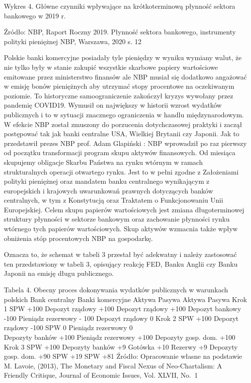 \documentclass[
]{book}
\begin{document}
Wykres 4. Główne czynniki wpływające na krótkoterminową płynność sektora bankowego w 2019 r.

Źródło: NBP, Raport Roczny 2019. Płynność sektora bankowego, instrumenty polityki pieniężnej NBP, Warszawa, 2020 s. 12

Polskie banki komercyjne posiadały tyle pieniędzy w wyniku wymiany walut, że nie tylko były w stanie zakupić wszystkie skarbowe papiery wartościowe emitowane przez ministerstwo finansów ale NBP musiał się dodatkowo angażować w emisję bonów pieniężnych aby utrzymać stopy procentowe na oczekiwanym poziomie. To historyczne samoograniczenie zakończył kryzys wywołany przez pandemię COVID19. Wymusił on największy w historii wzrost wydatków publicznych i to w sytuacji znacznego ograniczenia w handlu międzynarodowym. W efekcie NBP został zmuszony do porzucenia dotychczasowej praktyki i zaczął postępować tak jak banki centralne USA, Wielkiej Brytanii czy Japonii. Jak to przedstawił prezes NBP prof. Adam Glapiński : NBP wprowadził po raz pierwszy od początku transformacji program skupu aktywów finansowych. Od miesiąca skupujemy obligacje Skarbu Państwa na rynku wtórnym w ramach strukturalnych operacji otwartego rynku. Jest to w pełni zgodne z Założeniami polityki pieniężnej oraz mandatem banku centralnego wynikającym z europejskich i krajowych uwarunkowań prawnych dotyczących banków centralnych, w tym z Konstytucją oraz Traktatem o Funkcjonowaniu Unii Europejskiej. Celem skupu papierów wartościowych jest zmiana długoterminowej struktury płynności w sektorze bankowym oraz zachowanie płynności rynku wtórnego tych papierów wartościowych. Skup aktywów wzmacnia także wpływ obniżenia stóp procentowych NBP na gospodarkę.

Oznacza to, że schemat w tabeli 3 przestał być adekwatny i należy zastosować ten przedstawiony w tabeli 3, opisujący reakcję FED, Banku Anglii czy Banku Japonii na emisję długu publicznego.

Tabela 4. Obecny proces dokonywania wydatków publicznych w warunkach polskich Bank centralny Banki komercyjne Aktywa Pasywa Aktywa Pasywa Krok 1 SPW +100 Depozyt rządowy +100 Depozyt rządowy +100 Depozyt bankowy -100 Pieniądz rezerwowy - 100 Depozyt rządowy 0 Krok 2 SPW +100 Depozyt rządowy -100 SPW 0 Pieniądz rezerwowy 0\\
Depozyty banków +100 Pieniądz rezerwowy +100 Depozyty gosp. dom. +100 Krok 3 SPW +100 Depozyty banków +9 Gotówka +10 Rezerwy +9 Depozyty gosp. dom. +90 SPW +19 SPW +81 Źródło: Opracowanie własne na podstawie M. Lavoie, (2013), The Monetary and Fiscal Nexus of Neo-Chartalism: A Friendly Critique, Journal of Economic Issues, Vol. XLVII, No.~1
\end{document}
